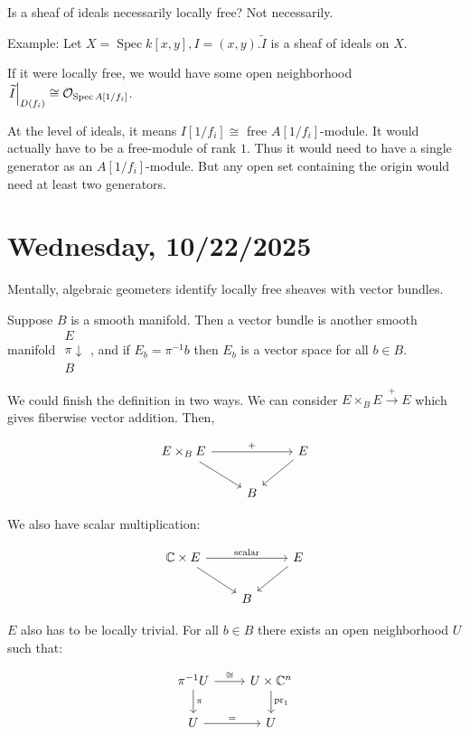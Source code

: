 \documentclass{article}
\theoremstyle{definition}
\begin{document}
    Is a sheaf of ideals necessarily locally free? Not necessarily.

    Example: Let \(X = \operatorname{Spec} k[x,y], I = (x,y). \widetilde{I}\) is a sheaf of ideals on \(X\).
    
    If it were locally free,  we would have some open neighborhood \(\eval{\widetilde{I}}_{D(f_i)} \cong \mathcal{O}_{\operatorname{Spec} A[1 / f_i]}\).
    
    At the level of ideals, it means \(I[1 / f_i] \cong\) free \(A[1 / f_i]\)-module. It would actually have to be a free-module of rank \(1\). Thus it would need to have a single generator as an \(A[1 / f_i]\)-module. But any open set containing the origin would need at least two generators.

    \section*{Wednesday, 10/22/2025}
    
    Mentally, algebraic geometers identify locally free sheaves with vector bundles.

    Suppose \(B\) is a smooth manifold. Then a vector bundle is another smooth manifold \(\begin{matrix}E \\ \pi\downarrow \\ B\end{matrix}\), and if \(E_b = \pi ^{-1} b\) then \(E_b\) is a vector space for all \(b\in B\).

    We could finish the definition in two ways. We can consider \(E \times_B E \xrightarrow{+} E\) which gives fiberwise vector addition. Then,

    \[
        \begin{tikzcd}
            E \times_B E \ar[rr,"+"] \ar[rd] & & E \ar[ld] \\ & B
        \end{tikzcd}
    \]

    We also have scalar multiplication:

    \[
        \begin{tikzcd}
            \mathbb{C} \times E \ar[rr, "\text{scalar}"] \ar[rd] & & E \ar[ld] \\ & B
        \end{tikzcd}
    \]

    \(E\) also has to be locally trivial. For all \(b\in B\) there exists an open neighborhood \(U\) such that:

    \[
        \begin{tikzcd}
            \pi ^{-1} U \ar[r,"\cong"] \ar[d,"\pi"] & U \times \mathbb{C}^n \ar[d,"\text{pr}_1"] \\ U \ar[r,"="] & U
        \end{tikzcd}
    \]
\end{document}
